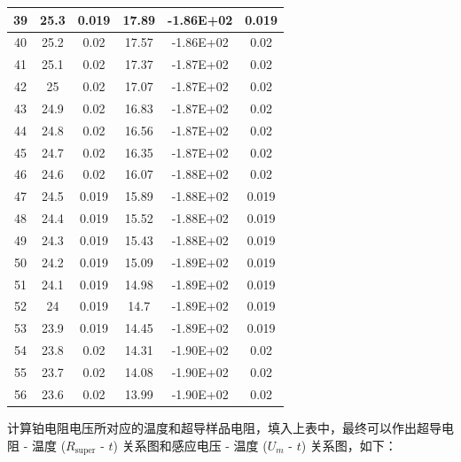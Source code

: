 \documentclass{THUexprep}
\begin{document}
\begin{longtable}{|c|c|c|c|c|c|}
    \hline
    39    & 25.3  & 0.019 & 17.89 & -1.86E+02 & 0.019 \\
    \hline
    40    & 25.2  & 0.02  & 17.57 & -1.86E+02 & 0.02 \\
    \hline
    41    & 25.1  & 0.02  & 17.37 & -1.87E+02 & 0.02 \\
    \hline
    42    & 25    & 0.02  & 17.07 & -1.87E+02 & 0.02 \\
    \hline
    43    & 24.9  & 0.02  & 16.83 & -1.87E+02 & 0.02 \\
    \hline
    44    & 24.8  & 0.02  & 16.56 & -1.87E+02 & 0.02 \\
    \hline
    45    & 24.7  & 0.02  & 16.35 & -1.87E+02 & 0.02 \\
    \hline
    46    & 24.6  & 0.02  & 16.07 & -1.88E+02 & 0.02 \\
    \hline
    47    & 24.5  & 0.019 & 15.89 & -1.88E+02 & 0.019 \\
    \hline
    48    & 24.4  & 0.019 & 15.52 & -1.88E+02 & 0.019 \\
    \hline
    49    & 24.3  & 0.019 & 15.43 & -1.88E+02 & 0.019 \\
    \hline
    50    & 24.2  & 0.019 & 15.09 & -1.89E+02 & 0.019 \\
    \hline
    51    & 24.1  & 0.019 & 14.98 & -1.89E+02 & 0.019 \\
    \hline
    52    & 24    & 0.019 & 14.7  & -1.89E+02 & 0.019 \\
    \hline
    53    & 23.9  & 0.019 & 14.45 & -1.89E+02 & 0.019 \\
    \hline
    54    & 23.8  & 0.02  & 14.31 & -1.90E+02 & 0.02 \\
    \hline
    55    & 23.7  & 0.02  & 14.08 & -1.90E+02 & 0.02 \\
    \hline
    56    & 23.6  & 0.02  & 13.99 & -1.90E+02 & 0.02 \\
    \hline
\end{longtable}

计算铂电阻电压所对应的温度和超导样品电阻，填入上表中，最终可以作出超导电阻 - 温度 ($R_\text{super}$ - $t$) 关系图和感应电压 - 温度 ($U_m$ - $t$) 关系图，如下：
\end{document}

